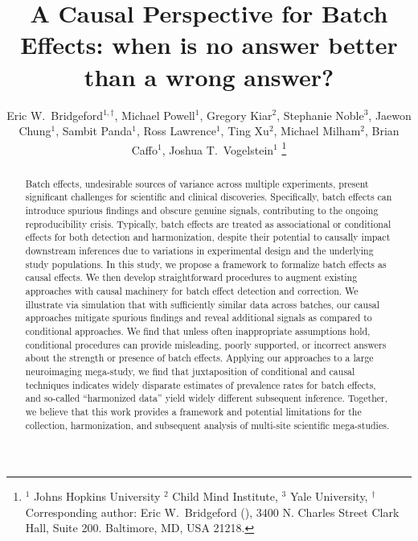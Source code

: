 \documentclass[onefignum,onetabnum,onealgnum,onethmnum, oneeqnum]{siamonline190516}
\title{
A Causal Perspective for Batch Effects: when is no answer better than a wrong answer?
}
\author{
    Eric W.~Bridgeford$^{1,\dagger}$, 
    Michael Powell$^1$,
    Gregory Kiar$^2$,
    Stephanie Noble$^3$,
    Jaewon Chung$^1$,
    Sambit Panda$^1$,
    Ross Lawrence$^1$,
    Ting Xu$^2$,
    Michael Milham$^2$,
    Brian Caffo$^1$,
    Joshua T.~Vogelstein$^{1}$
    \thanks{
     $^1$ Johns Hopkins University $^2$ Child Mind Institute, $^3$ Yale University,
    $^\dagger$ Corresponding author:
      Eric W.~Bridgeford (\email{ebridge2@jhu.edu}), 3400 N. Charles Street Clark Hall, Suite 200. Baltimore, MD, USA 21218.}
}
\newcommand{\edits}[1]{{\color{black} #1 }}
\begin{document}
\maketitle

\begin{abstract}
\edits{Batch effects, undesirable sources of variance across multiple experiments, present significant challenges for scientific and clinical discoveries. Specifically, batch effects can introduce spurious findings and obscure genuine signals, contributing to the ongoing reproducibility crisis. Typically, batch effects are treated as associational or conditional effects for both detection and harmonization, despite their potential to causally impact downstream inferences due to variations in experimental design and the underlying study populations. In this study, we propose a framework to formalize batch effects as causal effects. We then develop straightforward procedures to augment existing approaches with causal machinery for batch effect detection and correction. We illustrate via simulation that with sufficiently similar data across batches, our causal approaches mitigate spurious findings and reveal additional signals as compared to conditional approaches. We find that unless often inappropriate assumptions hold, conditional procedures can provide misleading, poorly supported, or incorrect answers about the strength or presence of batch effects. Applying our approaches to a large neuroimaging mega-study, we find that juxtaposition of conditional and causal techniques indicates widely disparate estimates of prevalence rates for batch effects, and so-called ``harmonized data'' yield widely different subsequent inference. Together, we believe that this work provides a framework and potential limitations for the collection, harmonization, and subsequent analysis of multi-site scientific mega-studies.}
\end{abstract}












\appendix

% 

\end{document}
